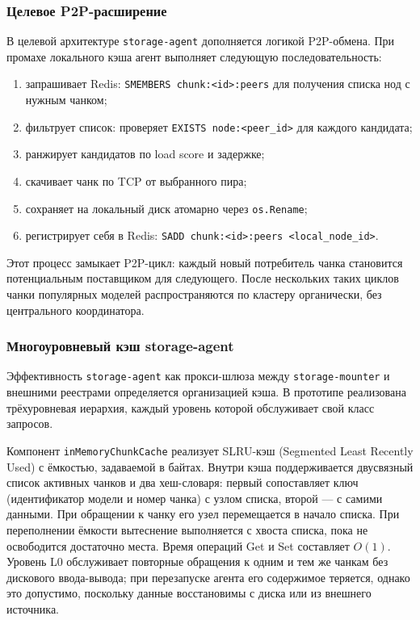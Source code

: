 \subsubsection{Целевое P2P-расширение}

В целевой архитектуре \texttt{storage-agent} дополняется логикой P2P-обмена. При промахе локального кэша агент выполняет следующую последовательность:
\begin{enumerate}[leftmargin=*]
  \item запрашивает Redis: \texttt{SMEMBERS chunk:<id>:peers} для получения списка нод с нужным чанком;
  \item фильтрует список: проверяет \texttt{EXISTS node:<peer\_id>} для каждого кандидата;
  \item ранжирует кандидатов по load score и задержке;
  \item скачивает чанк по TCP от выбранного пира;
  \item сохраняет на локальный диск атомарно через \texttt{os.Rename};
  \item регистрирует себя в Redis: \texttt{SADD chunk:<id>:peers <local\_node\_id>}.
\end{enumerate}

Этот процесс замыкает P2P-цикл: каждый новый потребитель чанка становится потенциальным поставщиком для следующего. После нескольких таких циклов чанки популярных моделей распространяются по кластеру органически, без центрального координатора.

\subsubsection{Многоуровневый кэш storage-agent}

Эффективность \texttt{storage-agent} как прокси-шлюза между \texttt{storage-mounter} и внешними реестрами определяется организацией кэша. В прототипе реализована трёхуровневая иерархия, каждый уровень которой обслуживает свой класс запросов.

 Компонент \texttt{inMemoryChunkCache} реализует SLRU-кэш (Segmented Least Recently Used) с ёмкостью, задаваемой в байтах. Внутри кэша поддерживается двусвязный список активных чанков и два хеш-словаря: первый сопоставляет ключ (идентификатор модели и номер чанка) с узлом списка, второй — с самими данными. При обращении к чанку его узел перемещается в начало списка. При переполнении ёмкости вытеснение выполняется с хвоста списка, пока не освободится достаточно места. Время операций Get и Set составляет $O(1)$. Уровень L0 обслуживает повторные обращения к одним и тем же чанкам без дискового ввода-вывода; при перезапуске агента его содержимое теряется, однако это допустимо, поскольку данные восстановимы с диска или из внешнего источника.

